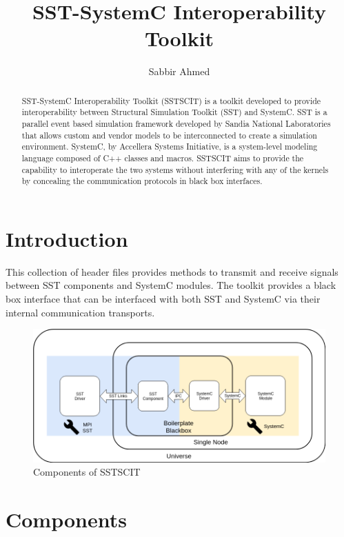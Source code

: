 \documentclass{article}
\title{SST-SystemC Interoperability Toolkit}
\author{
  Sabbir Ahmed
}
\begin{document}
  \maketitle

  \begin{abstract}
    SST-SystemC Interoperability Toolkit (SSTSCIT) is a toolkit developed to provide interoperability between Structural Simulation Toolkit (SST) and SystemC. SST is a parallel event based simulation framework developed by Sandia National Laboratories that allows custom and vendor models to be interconnected to create a simulation environment. SystemC, by Accellera Systems Initiative, is a system-level modeling language composed of C++ classes and macros. SSTSCIT aims to provide the capability to interoperate the two systems without interfering with any of the kernels by concealing the communication protocols in black box interfaces.
  \end{abstract}

  \section{Introduction}

  This collection of header files provides methods to transmit and receive signals between SST components and SystemC modules. The toolkit provides a black box interface that can be interfaced with both SST and SystemC via their internal communication transports. 

  \begin{figure}[!h]
    \centering
    \includegraphics[width=6in]{comm.png}
    \caption{Components of SSTSCIT}
    \label{fig:fig1}
  \end{figure}

  \section{Components} \label{sec:comp}
\end{document}
